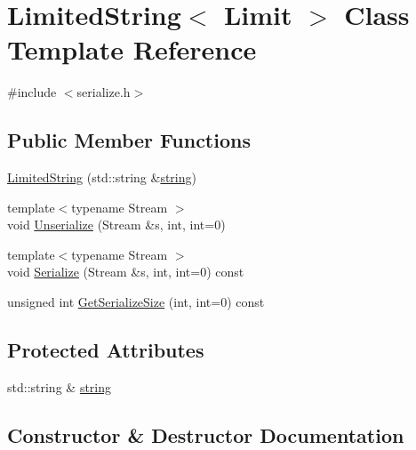 \hypertarget{class_limited_string}{}\section{Limited\+String$<$ Limit $>$ Class Template Reference}
\label{class_limited_string}


{\ttfamily \#include $<$serialize.\+h$>$}

\subsection*{Public Member Functions}
\begin{DoxyCompactItemize}
\item 
\mbox{\hyperlink{class_limited_string_afd9b0daa877f4d28c6b909bd34fd597d}{Limited\+String}} (std\+::string \&\mbox{\hyperlink{class_limited_string_a3f1d004f4632f7b2fda1a5a5afc266f7}{string}})
\item 
{\footnotesize template$<$typename Stream $>$ }\\void \mbox{\hyperlink{class_limited_string_a21ec9b742da8f8ff7b9a8b89131f943b}{Unserialize}} (Stream \&s, int, int=0)
\item 
{\footnotesize template$<$typename Stream $>$ }\\void \mbox{\hyperlink{class_limited_string_acb90369fef0efc1d51b730baa23307d8}{Serialize}} (Stream \&s, int, int=0) const
\item 
unsigned int \mbox{\hyperlink{class_limited_string_a9b5f6a92ed889442a212444ed51fcea9}{Get\+Serialize\+Size}} (int, int=0) const
\end{DoxyCompactItemize}
\subsection*{Protected Attributes}
\begin{DoxyCompactItemize}
\item 
std\+::string \& \mbox{\hyperlink{class_limited_string_a3f1d004f4632f7b2fda1a5a5afc266f7}{string}}
\end{DoxyCompactItemize}


\subsection{Constructor \& Destructor Documentation}
\mbox{\label{class_limited_string_afd9b0daa877f4d28c6b909bd34fd597d}} 
